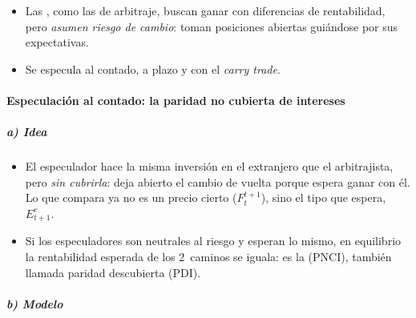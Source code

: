 \documentclass[11pt]{article}
\begin{document}
\begin{itemize}
\item Las , como las de arbitraje, buscan ganar con diferencias de rentabilidad, pero \emph{asumen riesgo de cambio}: toman posiciones abiertas guiándose por sus expectativas.
\item Se especula al contado, a plazo y con el \emph{carry trade}.
\end{itemize}

\paragraph{Especulación al contado: la paridad no cubierta de intereses}\label{sec:pnci}

\subparagraph{a) Idea}

\begin{itemize}
\item El especulador hace la misma inversión en el extranjero que el arbitrajista, pero \emph{sin cubrirla}: deja abierto el cambio de vuelta porque espera ganar con él. Lo que compara ya no es un precio cierto ($F_t^{t+1}$), sino el tipo que espera, $E^e_{t+1}$.
\item Si los especuladores son neutrales al riesgo y esperan lo mismo, en equilibrio la rentabilidad esperada de los 2~caminos se iguala: es la  (PNCI), también llamada paridad descubierta (PDI).
\end{itemize}

\subparagraph{b) Modelo}
\end{document}
